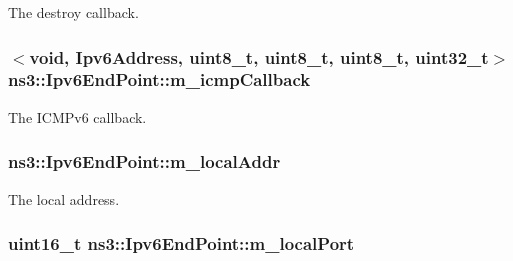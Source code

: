 The destroy callback. 

\subsubsection[{\texorpdfstring{m\+\_\+icmp\+Callback}{m_icmpCallback}}]{$<$void, {\bf Ipv6\+Address}, uint8\+\_\+t, uint8\+\_\+t, uint8\+\_\+t, uint32\+\_\+t$>$ ns3\+::\+Ipv6\+End\+Point\+::m\+\_\+icmp\+Callback\hspace{0.3cm}{\ttfamily [private]}}\hypertarget{classns3_1_1Ipv6EndPoint_a2a8245006d57149897aa7ded7fd65408}{}\label{classns3_1_1Ipv6EndPoint_a2a8245006d57149897aa7ded7fd65408}


The I\+C\+M\+Pv6 callback. 

\subsubsection[{\texorpdfstring{m\+\_\+local\+Addr}{m_localAddr}}]{ ns3\+::\+Ipv6\+End\+Point\+::m\+\_\+local\+Addr\hspace{0.3cm}{\ttfamily [private]}}\hypertarget{classns3_1_1Ipv6EndPoint_aa080e0cb8a56f2c99ec42093da6dfb4b}{}\label{classns3_1_1Ipv6EndPoint_aa080e0cb8a56f2c99ec42093da6dfb4b}


The local address. 

\subsubsection[{\texorpdfstring{m\+\_\+local\+Port}{m_localPort}}]{\setlength{\rightskip}{0pt plus 5cm}uint16\+\_\+t ns3\+::\+Ipv6\+End\+Point\+::m\+\_\+local\+Port\hspace{0.3cm}{\ttfamily [private]}}\hypertarget{classns3_1_1Ipv6EndPoint_addab74a83db5aac55fe0fd980e3e5657}{}\label{classns3_1_1Ipv6EndPoint_addab74a83db5aac55fe0fd980e3e5657}


